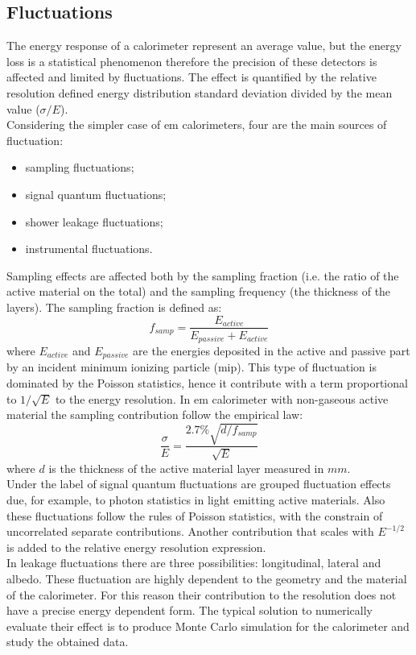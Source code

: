 \subsection{Fluctuations}
The energy response of a calorimeter represent an average value, but the energy loss is a statistical phenomenon therefore the precision of these detectors is affected and limited by fluctuations. The effect is quantified by the relative resolution defined energy distribution standard deviation divided by the mean value ($\sigma/E$).\\
Considering the simpler case of em calorimeters, four are the main sources of fluctuation:
\begin{itemize}
    \item sampling fluctuations;
    \item signal quantum fluctuations;
    \item shower leakage fluctuations;
    \item instrumental fluctuations.
\end{itemize}
Sampling effects are affected both by the sampling fraction (i.e. the ratio of the active material on the total) and the sampling frequency (the thickness of the layers). The sampling fraction is  defined as:
\begin{equation}
    f_{samp} = \frac{E_{active}}{E_{passive}+E_{active}}
\end{equation}
where $E_{active}$ and $E_{passive}$ are the energies deposited in the active and passive part by an incident minimum ionizing particle (mip).
This type of fluctuation is dominated by the Poisson statistics, hence it contribute with a term proportional to $1/\sqrt{E}$ to the energy resolution.
In em calorimeter with non-gaseous active material the sampling contribution follow the empirical law:
\begin{equation}
    \frac{\sigma}{E} = \frac{2.7\% \sqrt{d/f_{samp}}}{\sqrt{E}}
\end{equation}
where $d$ is the thickness of the active material layer measured in $mm$.\\
Under the label of signal quantum fluctuations are grouped fluctuation effects due, for example, to photon statistics in light emitting active materials. Also these fluctuations follow the rules of Poisson statistics, with the constrain of uncorrelated separate contributions. Another contribution that scales with $E^{-1/2}$ is added to the relative energy resolution expression.\\
In leakage fluctuations there are three possibilities: longitudinal, lateral and albedo. These fluctuation are highly dependent to the geometry and the material of the calorimeter. For this reason their contribution to the resolution does not have a precise energy dependent form. The typical solution to numerically evaluate their effect is to produce Monte Carlo simulation for the calorimeter and study the obtained data.\\
